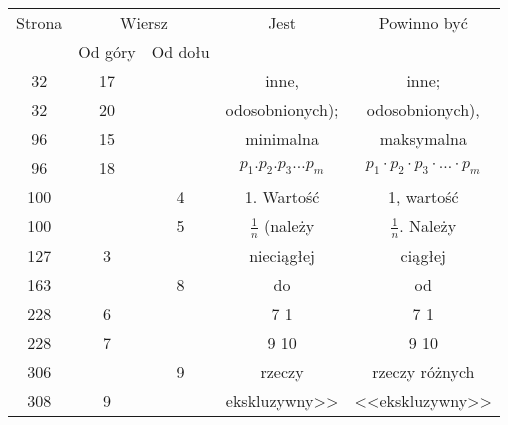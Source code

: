 \documentclass[a4paper,11pt]{article}
\begin{document}
\begin{center}

  \begin{tabular}{|c|c|c|c|c|}
    \hline
    Strona & \multicolumn{2}{c|}{Wiersz} & Jest
                              & Powinno być \\ \cline{2-3}
    & Od góry & Od dołu & & \\
    \hline
    32  & 17 & & inne, & inne; \\
    32  & 20 & & odosobnionych); & odosobnionych), \\
    96  & 15 & & minimalna & maksymalna \\
    96  & 18 & & $p_{ 1 } . p_{ 2 } . p_{ 3 } \ldots p_{ m }$
           & $p_{ 1 } \cdot p_{ 2 } \cdot p_{ 3 } \cdot \ldots \cdot p_{ m }$ \\
    100 & &  4 & 1. Wartość & 1, wartość \\
    100 & &  5 & $\frac{ 1 }{ n }$ (należy & $\frac{ 1 }{ n }$. Należy \\
    127 &  3 & & nieciągłej & ciągłej \\
    163 & &  8 & do & od \\
    228 &  6 & & 7{ }{ }{ } 1 & 7{ }{ } 1 \\
    228 &  7 & & 9{ }{ } 10 & 9 10 \\
    306 & &  9 & rzeczy & rzeczy różnych \\
    308 &  9 & & ekskluzywny>> & <<ekskluzywny>> \\
    \hline
  \end{tabular}

\end{center}

\vspace{\spaceTwo}












\newpage

\end{document}
